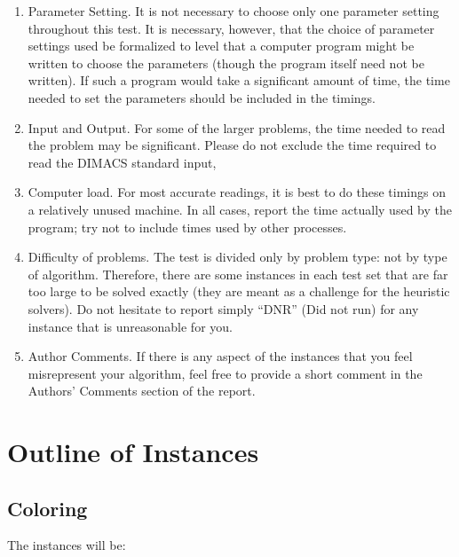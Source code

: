 \begin{enumerate}
\item Parameter Setting.  It is not necessary to choose only one
  parameter setting throughout this test.  It is necessary, however,
  that the choice of parameter settings used be formalized to level
  that a computer program might be written to choose the parameters
  (though the program itself need not be written).  If such a program
  would take a significant amount of time, the time needed to set the
  parameters should be included in the timings.

\item Input and Output.  For some of the larger problems, the time
  needed to read the problem may be significant.  Please do not
  exclude the time required to read the DIMACS standard input,

\item Computer load.  For most accurate readings, it is best to do
  these timings on a relatively unused machine.  In all cases, report
  the time actually used by the program; try not to include times used
  by other processes.

\item Difficulty of problems.  The test is divided only by problem
  type: not by type of algorithm.  Therefore, there are some instances
  in each test set that are far too large to be solved exactly (they
  are meant as a challenge for the heuristic solvers).  Do not
  hesitate to report simply ``DNR'' (Did not run) for any instance
  that is unreasonable for you.

\item Author Comments.  If there is any aspect of the instances that
  you feel misrepresent your algorithm, feel free to provide a short
  comment in the Authors' Comments section of the report.
\end{enumerate}

\section{Outline of Instances}

\subsection{Coloring}

The instances will be:

